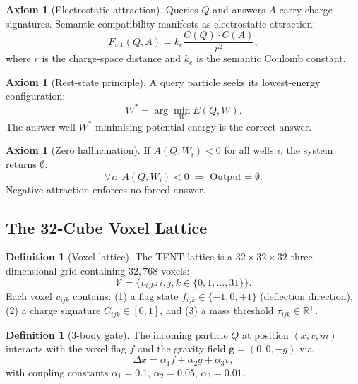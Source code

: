 \documentclass[12pt,a4paper]{article}
\theoremstyle{plain}
\theoremstyle{definition}
\newtheorem{definition}[theorem]{Definition}
\newtheorem{axiom}[theorem]{Axiom}
\theoremstyle{remark}
\begin{document}
\begin{axiom}[Electrostatic attraction]
Queries $Q$ and answers $A$ carry charge signatures.
Semantic compatibility manifests as electrostatic attraction:
\begin{equation}
F_{\text{att}}(Q,A) = k_e \frac{C(Q) \cdot C(A)}{r^2},
\end{equation}
where $r$ is the charge-space distance and $k_e$ is the semantic
Coulomb constant.
\end{axiom}

\begin{axiom}[Rest-state principle]
A query particle seeks its lowest-energy configuration:
\begin{equation}
W^* = \arg\min_W E(Q,W).
\end{equation}
The answer well $W^*$ minimising potential energy is the correct answer.
\end{axiom}

\begin{axiom}[Zero hallucination]
If $A(Q,W_i) < 0$ for all wells $i$, the system returns $\emptyset$:
\begin{equation}
\forall i:\; A(Q,W_i) < 0 \;\Longrightarrow\; \text{Output} = \emptyset.
\end{equation}
Negative attraction enforces no forced answer.
\end{axiom}

\subsection{The 32-Cube Voxel Lattice}

\begin{definition}[Voxel lattice]
The TENT lattice is a $32\times 32\times 32$ three-dimensional grid
containing $32{,}768$ voxels:
\begin{equation}
\mathcal{V} = \{v_{ijk} : i,j,k \in \{0,1,\ldots,31\}\}.
\end{equation}
Each voxel $v_{ijk}$ contains:
(1) a flag state $f_{ijk} \in \{-1,0,+1\}$ (deflection direction),
(2) a charge signature $C_{ijk} \in [0,1]$, and
(3) a mass threshold $\tau_{ijk} \in \mathbb{R}^+$.
\end{definition}

\begin{definition}[3-body gate]
The incoming particle $Q$ at position $(x,v,m)$ interacts with the
voxel flag $f$ and the gravity field $\mathbf{g}=(0,0,-g)$ via
\begin{equation}
\Delta x = \alpha_1 f + \alpha_2 g + \alpha_3 v,
\label{eq:3body}
\end{equation}
with coupling constants $\alpha_1 = 0.1$, $\alpha_2 = 0.05$,
$\alpha_3 = 0.01$.
\end{definition}
\end{document}
